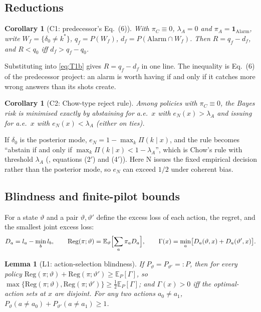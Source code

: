 \documentclass[10pt,twocolumn]{article}
\newtheorem{lemma}[theorem]{Lemma}
\newtheorem{corollary}[theorem]{Corollary}
\theoremstyle{definition}
\theoremstyle{remark}
\newcommand{\E}{\mathbb{E}}
\newcommand{\vt}{\vartheta}
\newcommand{\lA}{\lambda_A}
\newcommand{\one}{\mathbf 1}
\newcommand{\Reg}{\mathrm{Reg}}
\begin{document}
\subsection{Reductions}

\begin{corollary}[C1: predecessor's Eq.~(6)]\label{cor:C1}
With $\pi_C\equiv0$, $\lA=0$ and $\pi_A=\one_{\mathrm{Alarm}}$, write $W_f=\{\delta_0\neq k^*\}$, $q_f=P(W_f)$, $d_f=P(\mathrm{Alarm}\cap W_f)$. Then $R=q_f-d_f$, and $R<q_0$ iff $d_f>q_f-q_0$.
\end{corollary}
Substituting into \eqref{eq:T1b} gives $R=q_f-d_f$ in one line. The inequality is Eq.~(6) of the predecessor project: an alarm is worth having if and only if it catches more wrong answers than its shots create.

\begin{corollary}[C2: Chow-type reject rule]\label{cor:C2}
Among policies with $\pi_C\equiv0$, the Bayes risk is minimised exactly by abstaining for a.e.\ $x$ with $e_N(x)>\lA$ and issuing for a.e.\ $x$ with $e_N(x)<\lA$ (either on ties).
\end{corollary}
If $\delta_0$ is the posterior mode, $e_N=1-\max_k\Pi(k\mid x)$, and the rule becomes ``abstain if and only if $\max_k\Pi(k\mid x)<1-\lA$'', which is Chow's rule with threshold $\lA$ (\cite{chow1970}, equations (2$'$) and (4$'$)). Here N issues the fixed empirical decision rather than the posterior mode, so $e_N$ can exceed $1/2$ under coherent bias.

\subsection{Blindness and finite-pilot bounds}

For a state $\vt$ and a pair $\vt,\vt'$ define the excess loss of each action, the regret, and the smallest joint excess loss:
\begin{gather*}
D_a=l_a-\min_b l_b,\dsep
\Reg(\pi;\vt)=\E_\vt\Bigl[\sum_a\pi_aD_a\Bigr],\dsep
\Gamma(x)=\min_a\bigl[D_a(\vt,x)+D_a(\vt',x)\bigr].
\end{gather*}

\begin{lemma}[L1: action-selection blindness]\label{lem:L1}
If $P_\vt=P_{\vt'}=:P$, then for every policy $\Reg(\pi;\vt)+\Reg(\pi;\vt')\ge\E_P[\Gamma]$, so $\max\{\Reg(\pi;\vt),\Reg(\pi;\vt')\}\ge\tfrac12\E_P[\Gamma]$; and $\Gamma(x)>0$ iff the optimal-action sets at $x$ are disjoint. For any two actions $a_0\neq a_1$, $P_\vt(a\neq a_0)+P_{\vt'}(a\neq a_1)\ge1$.
\end{lemma}
\end{document}
